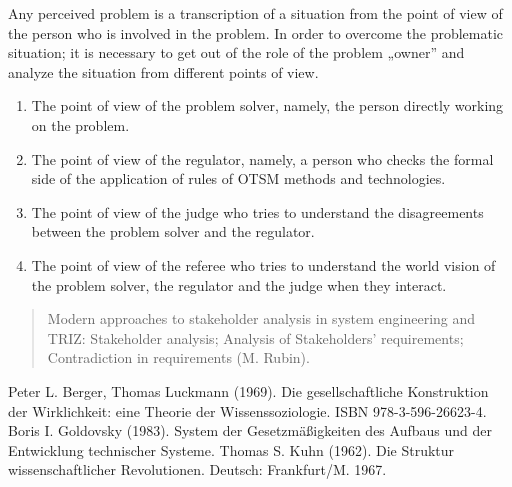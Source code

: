 \documentclass[11pt,a4paper]{article}
\begin{document}
Any perceived problem is a transcription of a situation from the point of view
of the person who is involved in the problem. In order to overcome the
problematic situation; it is necessary to get out of the role of the problem
„owner” and analyze the situation from different points of view.
\begin{enumerate}[noitemsep]
\item The point of view of the problem solver, namely, the person directly
  working on the problem.
\item The point of view of the regulator, namely, a person who checks the
  formal side of the application of rules of OTSM methods and technologies.
\item The point of view of the judge who tries to understand the disagreements
  between the problem solver and the regulator.
\item The point of view of the referee who tries to understand the world
  vision of the problem solver, the regulator and the judge when they
  interact.
\end{enumerate}
\begin{quote}  
  Modern approaches to stakeholder analysis in system engineering and TRIZ:
  Stakeholder analysis; Analysis of Stakeholders’ requirements; Contradiction
  in requirements (M. Rubin).
\end{quote}

\begin{thebibliography}{xxx}
 Peter L. Berger, Thomas Luckmann (1969). Die
  gesellschaftliche Konstruktion der Wirklichkeit: eine Theorie der
  Wissenssoziologie. ISBN 978-3-596-26623-4.
 Boris I. Goldovsky (1983). System der
  Gesetzmäßigkeiten des Aufbaus und der Entwicklung technischer Systeme.
 Thomas S. Kuhn (1962). Die Struktur wissenschaftlicher
  Revolutionen. Deutsch: Frankfurt/M. 1967.
\end{thebibliography}
\end{document}
